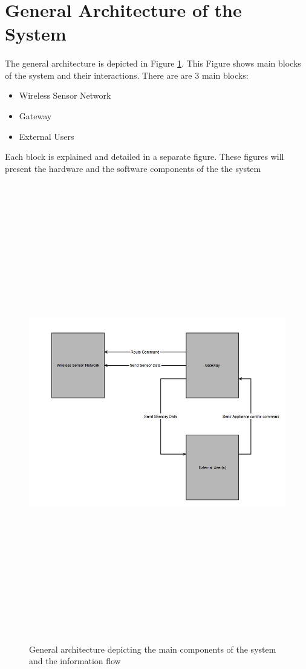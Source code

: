 \documentclass[12pt,a4paper,final]{report}
\begin{document}
\section{General Architecture of the System}
\paragraph{}
The general architecture is depicted in Figure \ref{fig:gen_architecture}. This Figure shows main blocks of the system and their interactions. There are are 3 main blocks:
\begin{itemize}
\item Wireless Sensor Network
\item Gateway
\item External Users
\end{itemize}
Each block is explained and detailed in a separate figure. These figures will present the hardware and the software components of the the system

\begin{figure}[htbp]
\centering
\includegraphics[width=17cm,height=20cm,keepaspectratio]{img/architecture_general.jpg}
\caption{General architecture depicting the main components of the system and the information flow}
\label{fig:gen_architecture}
\end{figure}
\clearpage
\end{document}
